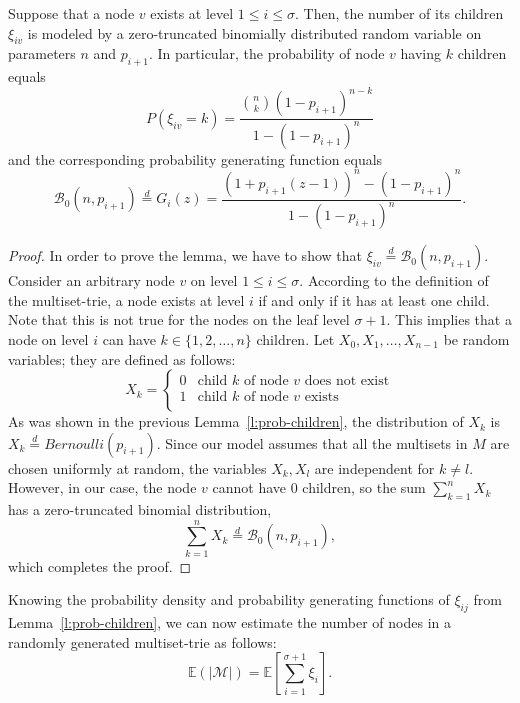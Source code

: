 \documentclass[algorithms,article,accept,pdftex,moreauthors]{Definitions/mdpi}
\begin{document}
\begin{Lemma}\label{l:prob-children}
Suppose that a node $v$ exists at level $1\leq i\leq\sigma$.
Then, the number of its children $\xi_{iv}$ is modeled by a zero-truncated binomially
distributed random variable on parameters $n$ and $p_{i+1}$. In particular,
the probability of node $v$ having $k$ children equals
\begin{equation}\label{eq:pdf}
P(\xi_{iv} = k) = \frac{\binom{n}{k} (1-p_{i+1})^{n-k}}{1-(1-p_{i+1})^n}
\end{equation}
and the corresponding probability generating function equals
\begin{equation}\label{eq:generating_func}
\mathcal{B}_0(n,p_{i+1})\overset{d}{=}
G_i(z) = \frac{(1+p_{i+1}(z-1))^n - (1-p_{i+1})^n}{1-(1-p_{i+1})^n}.
\end{equation}


\end{Lemma}
\begin{proof}
In order to prove the lemma, we have to show that
$\xi_{iv}\overset{d}{=}\mathcal{B}_0(n, p_{i+1}).$
Consider an arbitrary node $v$ on level $1\leq i\leq\sigma.$ According to the
definition of the multiset-trie, a node exists at level $i$ if and only if
it has at least one child. Note that this is not true for the nodes on the leaf
level $\sigma + 1.$ This implies that a node on level $i$ can have
$k\in\{ 1,2,\ldots, n\}$ children. Let $X_0, X_1, \ldots, X_{n-1}$ be random
variables; they are defined as follows:
\[
X_k = \begin{cases}
0 & \textrm{child $k$ of node $v$ does not exist} \\
1 & \textrm{child $k$ of node $v$ exists} \\
\end{cases}
\]
As was shown in the previous Lemma~\ref{l:prob-children}, the distribution of 
$X_k$ is $X_k\overset{d}{=} Bernoulli(p_{i+1}).$ Since our model assumes that all the 
multisets in $M$ are chosen uniformly at random, the variables 
$X_k,X_l$ are independent for $k\neq l.$ However, in our case, the node $v$ cannot 
have 0 children, so the sum $\sum_{k=1}^n X_k$ has a zero-truncated binomial 
distribution,
%
\[
\sum_{k=1}^n X_k \overset{d}{=} \mathcal{B}_0(n,p_{i+1}),
\] 
%
which completes the proof.
\end{proof}
%
Knowing the probability density and probability generating functions of $\xi_{ij}$ 
from Lemma~\ref{l:prob-children}, we can now estimate the number of nodes in 
a randomly generated multiset-trie as follows:
%
\begin{equation}\label{eq:num_nodes}
\mathbb{E}( | \mathcal{M} | ) = \mathbb{E}\left[ \sum_{i=1}^{\sigma+1} \xi_i \right].
\end{equation}
%
\end{document}
